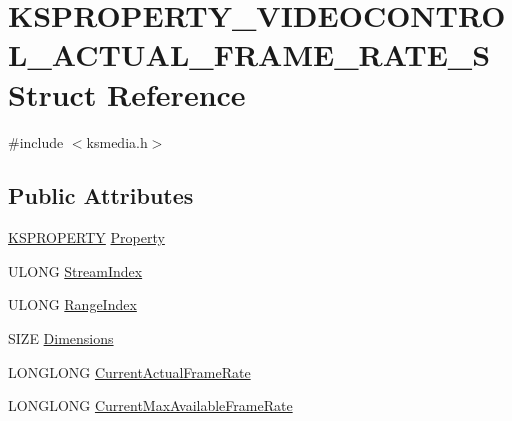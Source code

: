 \hypertarget{struct_k_s_p_r_o_p_e_r_t_y___v_i_d_e_o_c_o_n_t_r_o_l___a_c_t_u_a_l___f_r_a_m_e___r_a_t_e___s}{}\section{K\+S\+P\+R\+O\+P\+E\+R\+T\+Y\+\_\+\+V\+I\+D\+E\+O\+C\+O\+N\+T\+R\+O\+L\+\_\+\+A\+C\+T\+U\+A\+L\+\_\+\+F\+R\+A\+M\+E\+\_\+\+R\+A\+T\+E\+\_\+S Struct Reference}
\label{struct_k_s_p_r_o_p_e_r_t_y___v_i_d_e_o_c_o_n_t_r_o_l___a_c_t_u_a_l___f_r_a_m_e___r_a_t_e___s}


{\ttfamily \#include $<$ksmedia.\+h$>$}

\subsection*{Public Attributes}
\begin{DoxyCompactItemize}
\item 
\hyperlink{ks_8h_a4392f77c74e868d813d46c39ada4d660}{K\+S\+P\+R\+O\+P\+E\+R\+TY} \hyperlink{struct_k_s_p_r_o_p_e_r_t_y___v_i_d_e_o_c_o_n_t_r_o_l___a_c_t_u_a_l___f_r_a_m_e___r_a_t_e___s_a210cb2fb3c1c4afe602719b6b36d274d}{Property}
\item 
U\+L\+O\+NG \hyperlink{struct_k_s_p_r_o_p_e_r_t_y___v_i_d_e_o_c_o_n_t_r_o_l___a_c_t_u_a_l___f_r_a_m_e___r_a_t_e___s_ace807cd9eaef0e6a5e6f54b2aec8e4ff}{Stream\+Index}
\item 
U\+L\+O\+NG \hyperlink{struct_k_s_p_r_o_p_e_r_t_y___v_i_d_e_o_c_o_n_t_r_o_l___a_c_t_u_a_l___f_r_a_m_e___r_a_t_e___s_ad5f6d847186fbc112f99245dcceb0cf5}{Range\+Index}
\item 
S\+I\+ZE \hyperlink{struct_k_s_p_r_o_p_e_r_t_y___v_i_d_e_o_c_o_n_t_r_o_l___a_c_t_u_a_l___f_r_a_m_e___r_a_t_e___s_a70851b157301499bf6464919b0f2de42}{Dimensions}
\item 
L\+O\+N\+G\+L\+O\+NG \hyperlink{struct_k_s_p_r_o_p_e_r_t_y___v_i_d_e_o_c_o_n_t_r_o_l___a_c_t_u_a_l___f_r_a_m_e___r_a_t_e___s_a5d6dd125b3e3707472d2c0ca982fb4c9}{Current\+Actual\+Frame\+Rate}
\item 
L\+O\+N\+G\+L\+O\+NG \hyperlink{struct_k_s_p_r_o_p_e_r_t_y___v_i_d_e_o_c_o_n_t_r_o_l___a_c_t_u_a_l___f_r_a_m_e___r_a_t_e___s_ab4c91b43e28c0f1cf0ace9a24a134da7}{Current\+Max\+Available\+Frame\+Rate}
\end{DoxyCompactItemize}


